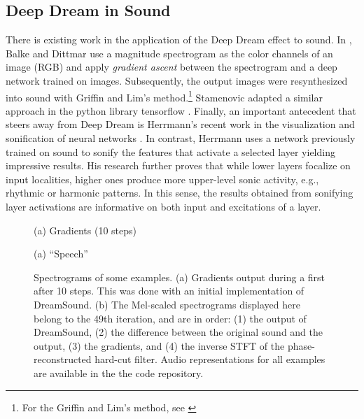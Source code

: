 \documentclass[a4paper,10pt,oneside]{article}
\begin{document}
\begin{sloppy}
\subsection{Deep Dream in Sound}
There is existing work in the application of the Deep Dream effect \cite{Mordvintsev2015} to sound. In \cite{Balke2015}, Balke and Dittmar use a magnitude spectrogram as the color channels of an image (RGB) and apply \textit{gradient ascent} between the spectrogram and a deep network trained on images. Subsequently, the output images were resynthesized into sound with Griffin and Lim's method.\footnote{For the Griffin and Lim's method, see \cite{Lim1983}} Stamenovic adapted a similar approach in the python library tensorflow \cite{Stamenovic2016}. Finally, an important antecedent that steers away from Deep Dream is Herrmann's recent work in the visualization and sonification of neural networks \cite{pmlr-v123-herrmann20a}. In contrast, Herrmann uses a network previously trained on sound to sonify the features that activate a selected layer yielding impressive results. His research further proves that while lower layers focalize on input localities, higher ones produce more upper-level sonic activity, e.g., rhythmic or harmonic patterns. In this sense, the results obtained from sonifying layer activations are informative on both input and excitations of a layer. 

\begin{figure}[H]
\begin{minipage}[h]{1\columnwidth}
  \centerline{}
  \centerline{(a) Gradients (10 steps)}\medskip
\end{minipage}
\begin{minipage}[h]{1\columnwidth}
  \centerline{}
  \centerline{(a) ``Speech''}\medskip
\end{minipage}
\caption{Spectrograms of some examples. (a) Gradients output during a first after 10 steps. This was done with an initial implementation of DreamSound. (b) The Mel-scaled spectrograms displayed here belong to the 49th iteration, and are in order: (1) the output of DreamSound, (2) the difference between the original sound and the output, (3) the gradients, and (4) the inverse STFT of the phase-reconstructed hard-cut filter. Audio representations for all examples are available in the the code repository.}
\label{fig:melspecs}
\end{figure}


\end{sloppy}
\end{document}
